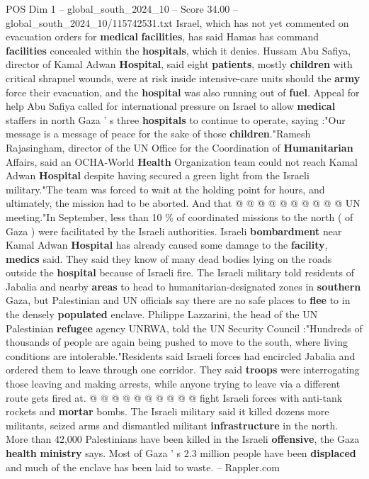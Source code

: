 \begin{textsample}{POS Dim 1 – global\_south\_2024\_10 – Score 34.00 – global\_south\_2024\_10/115742531.txt}
Israel, which has not yet commented on evacuation orders for \textbf{medical} \textbf{facilities}, has said Hamas has command \textbf{facilities} concealed within the \textbf{hospitals}, which it denies.
Hussam Abu Safiya, director of Kamal Adwan \textbf{Hospital}, said eight \textbf{patients}, mostly \textbf{children} with critical shrapnel wounds, were at risk inside intensive-care units should the \textbf{army} force their evacuation, and the \textbf{hospital} was also running out of \textbf{fuel}.
Appeal for help Abu Safiya called for international pressure on Israel to allow \textbf{medical} staffers in north Gaza ' s three \textbf{hospitals} to continue to operate, saying :"Our message is a message of peace for the sake of those \textbf{children}."Ramesh Rajasingham, director of the UN Office for the Coordination of \textbf{Humanitarian} Affairs, said an OCHA-World \textbf{Health} Organization team could not reach Kamal Adwan \textbf{Hospital} despite having secured a green light from the Israeli military."The team was forced to wait at the holding point for hours, and ultimately, the mission had to be aborted.
And that @ @ @ @ @ @ @ @ @ @ UN meeting."In September, less than 10 \% of coordinated missions to the north ( of Gaza ) were facilitated by the Israeli authorities.
Israeli \textbf{bombardment} near Kamal Adwan \textbf{Hospital} has already caused some damage to the \textbf{facility}, \textbf{medics} said.
They said they know of many dead bodies lying on the roads outside the \textbf{hospital} because of Israeli fire.
The Israeli military told residents of Jabalia and nearby \textbf{areas} to head to humanitarian-designated zones in \textbf{southern} Gaza, but Palestinian and UN officials say there are no safe places to \textbf{flee} to in the densely \textbf{populated} enclave.
Philippe Lazzarini, the head of the UN Palestinian \textbf{refugee} agency UNRWA, told the UN Security Council :"Hundreds of thousands of people are again being pushed to move to the south, where living conditions are intolerable."Residents said Israeli forces had encircled Jabalia and ordered them to leave through one corridor.
They said \textbf{troops} were interrogating those leaving and making arrests, while anyone trying to leave via a different route gets fired at. @ @ @ @ @ @ @ @ @ @ fight Israeli forces with anti-tank rockets and \textbf{mortar} bombs.
The Israeli military said it killed dozens more militants, seized arms and dismantled militant \textbf{infrastructure} in the north.
More than 42,000 Palestinians have been killed in the Israeli \textbf{offensive}, the Gaza \textbf{health} \textbf{ministry} says.
Most of Gaza ' s 2.3 million people have been \textbf{displaced} and much of the enclave has been laid to waste. -- Rappler.com

\end{textsample}
